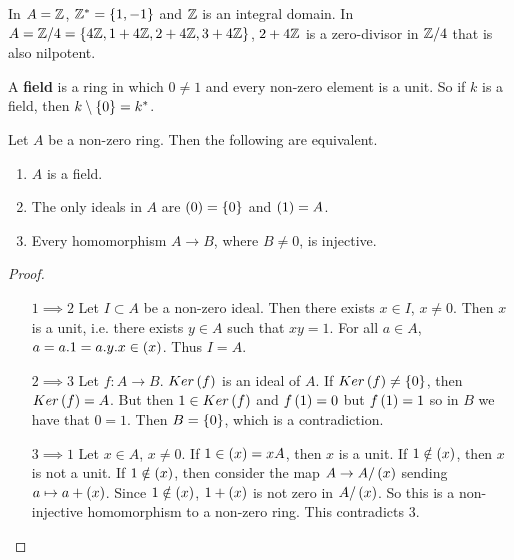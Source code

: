 \begin{example*}
In $ A = \mathbb{Z} $, $ \mathbb{Z}^* = \left\{ 1, -1 \right\} $ and $ \mathbb{Z} $ is an integral domain. In $ A = \mathbb{Z} / 4 = \left\{ 4\mathbb{Z}, 1 + 4\mathbb{Z}, 2 + 4\mathbb{Z}, 3 + 4\mathbb{Z} \right\} $, $ 2 + 4\mathbb{Z} $ is a zero-divisor in $ \mathbb{Z} / 4 $ that is also nilpotent.
\end{example*}


\begin{definition}
A \textbf{field} is a ring in which $ 0 \ne 1 $ and every non-zero element is a unit. So if $ k $ is a field, then $ k \setminus \left\{ 0 \right\} = k^* $.
\end{definition}

\begin{proposition}
Let $ A $ be a non-zero ring. Then the following are equivalent.
\begin{enumerate}
\item $ A $ is a field.
\item The only ideals in $ A $ are $ \left( 0 \right) = \left\{ 0 \right\} $ and $ \left( 1 \right) = A $.
\item Every homomorphism $ A \to B $, where $ B \ne 0 $, is injective.
\end{enumerate}
\end{proposition}

\begin{proof}
\hfill
\begin{itemize}[leftmargin=0.5in]
\item[$ 1 \implies 2 $] Let $ I \subset A $ be a non-zero ideal. Then there exists $ x \in I $, $ x \ne 0 $. Then $ x $ is a unit, i.e. there exists $ y \in A $ such that $ xy = 1 $. For all $ a \in A $, $ a = a.1 = a.y.x \in \left( x \right) $. Thus $ I = A $.
\item[$ 2 \implies 3 $] Let $ f : A \to B $. $ Ker\left( f \right) $ is an ideal of $ A $. If $ Ker\left( f \right) \ne \left\{ 0 \right\} $, then $ Ker\left( f \right) = A $. But then $ 1 \in Ker\left( f \right) $ and $ f\left( 1 \right) = 0 $ but $ f\left( 1 \right) = 1 $ so in $ B $ we have that $ 0 = 1 $. Then $ B = \left\{ 0 \right\} $, which is a contradiction.
\item[$ 3 \implies 1 $] Let $ x \in A $, $ x \ne 0 $. If $ 1 \in \left( x \right) = xA $, then $ x $ is a unit. If $ 1 \notin \left( x \right) $, then $ x $ is not a unit. If $ 1 \notin \left( x \right) $, then consider the map $ A \to A / \left( x \right) $ sending $ a \mapsto a + \left( x \right) $. Since $ 1 \notin \left( x \right) $, $ 1 + \left( x \right) $ is not zero in $ A / \left( x \right) $. So this is a non-injective homomorphism to a non-zero ring. This contradicts $ 3 $.
\end{itemize}
\end{proof}

